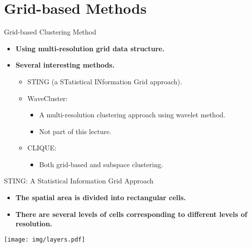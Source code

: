 \section{Grid-based Methods}

\begin{frame}{Grid-based Clustering Method}
	\begin{itemize}
		\item \textbf{Using multi-resolution grid data structure.}
		\item \textbf{Several interesting methods.}
		      \begin{itemize}
			      \item STING (a STatistical INformation Grid approach).
			      \item WaveCluster:
			            \begin{itemize}
				            \item A multi-resolution clustering approach using wavelet
				                  method.
				            \item Not part of this lecture.
			            \end{itemize}
			      \item CLIQUE:
			            \begin{itemize}
				            \item Both grid-based and subspace clustering.
			            \end{itemize}
		      \end{itemize}
	\end{itemize}
\end{frame}

\begin{frame}{STING: A Statistical Information Grid Approach}
	\begin{itemize}
		\item \textbf{The spatial area is divided into rectangular cells.}
		\item \textbf{There are several levels of cells corresponding to
			      different levels of resolution.}
	\end{itemize}
	\vspace{0.5cm}
	\centering
	\texttt{[image: img/layers.pdf]}
\end{frame}

